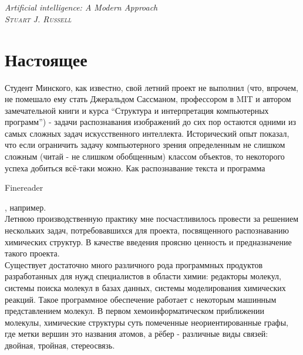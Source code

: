 





\onecolumn

\setlength{\epigraphwidth}{8cm}

\begin{epigraphs}
    \\ \\ 
	 { \tiny{ \it{Artificial intelligence: A Modern Approach} \\ \textsc{Stuart J. Russell}}}
\end{epigraphs}  

\section*{Наcтоящее}

Студент Минского, как известно, свой летний проект не выполнил (что, впрочем, не помешало ему стать
Джеральдом Сассманом, профессором в MIT и автором замечательной книги и курса ``Структура и интерпретация
компьютерных программ'') - задачи распознавания изображений до сих пор остаются
одними из самых сложных задач искусственного интеллекта. Исторический опыт показал, что если ограничить задачу
компьютерного зрения определенным не слишком сложным (читай - не слишком обобщенным) классом объектов, то некоторого
успеха добиться всё-таки можно. Как распознавание текста и программа \begin{tt}Finereader\end{tt}, например. \\

\noindent
Летнюю производственную практику мне посчастливилось провести за решением нескольких задач, потребовавшихся
для проекта, посвященного распознаванию химических структур. В качестве введения проясню ценность и предназначение
такого проекта.\\

\noindent
Существует достаточно много различного рода программных продуктов разработанных для нужд специалистов в области химии:
редакторы молекул, системы поиска молекул в базах данных, системы моделирования химических реакций. Такое программное 
обеспечение работает с некоторым машинным представлением молекул.
В первом хемоинформатическом приближении молекулы,
химические структуры суть помеченные неориентированные графы, где метки вершин это названия атомов, а рёбер - различные
виды связей: двойная, тройная, стереосвязь. \\


